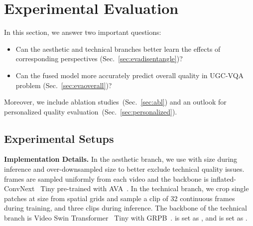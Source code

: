 \documentclass[10pt,twocolumn,letterpaper]{article}
\renewcommand{\paragraph}[1]{\noindent \textbf{#1}}
\newcommand{\green}[1]{\textcolor{mgreen}{#1}}
\begin{document}
\label{sec:4d}









\begin{comment}
\begin{figure}
    \centering
    \texttt{[image: New\_Fig\_5\_compressed.pdf]}
    \vspace{-8pt}
    \caption{Two representation-level fusion (transfer learning) strategies. The \textit{head-only} transfer examines the representation abilities of  and , while the \textit{end-to-end} transfer evaluates the completeness of the views.}
    \label{fig:twofinetune}
    \vspace{-15pt}
\end{figure}
\end{comment}

\section{Experimental Evaluation}

In this section, we answer two important questions:

\begin{itemize}
    \item  Can the aesthetic and technical branches better learn the effects of corresponding perspectives (Sec.~\ref{sec:evadisentangle})? 
    \item  Can the fused model more accurately predict overall quality in UGC-VQA problem (Sec.~\ref{sec:evaoverall})?
\end{itemize}   
Moreover, we include ablation studies~(Sec.~\ref{sec:abl}) and an outlook for personalized quality evaluation~(Sec.~\ref{sec:personalized}). 









\subsection{Experimental Setups}
\label{sec:impdetail}

\paragraph{Implementation Details.} 
In the aesthetic branch, we use  with size  during inference and over-downsampled  size  to better exclude technical quality issues.  frames are sampled uniformly from each video and the backbone is inflated-ConvNext~\cite{convnext} \green{Tiny} pre-trained with AVA~\cite{avaiaa}. In the technical branch, we crop single patches at size  from  spatial grids and sample a clip of 32 continuous frames during training, and three clips during inference. The backbone of the technical branch is Video Swin Transformer~\cite{swin3d} \green{Tiny} with GRPB~\cite{fastvqa}.  is set as , and  is set as .
\end{document}

